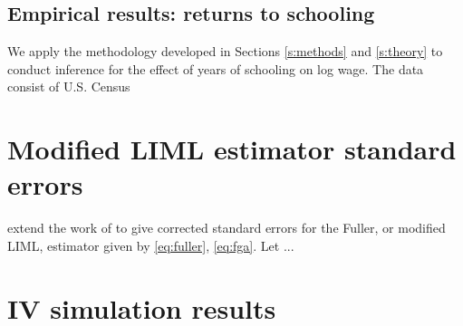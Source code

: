 \documentclass{uwstat572}
\renewcommand{\baselinestretch}{1.5}
\theoremstyle{definition}
\theoremstyle{remark}
\numberwithin{equation}{section}
\begin{document}
\renewcommand{\baselinestretch}{1.5} 

%
\subsection{Empirical results: returns to schooling}

We apply the methodology developed in Sections \ref{s:methods} and \ref{s:theory} to conduct inference for the effect of years of schooling on log wage. The data consist of  U.S. Census 





\appendix
%


%
\section{Modified LIML estimator standard errors}\label{a:becker}
\newcommand{\uh}{\hat{\u}}
\newcommand{\uhc}{\hat{u}}
\newcommand{\uhi}{\uhc_i}
\newcommand{\sdsh}{\hat{\sds}}

\cite{HHN08} extend the work of \cite{B94} to give corrected standard errors for the Fuller, or modified LIML, estimator given by \eqref{eq:fuller}, \eqref{eq:fga}. Let ...

%
\section{IV simulation results}\label{a:simulations}
\end{document}
